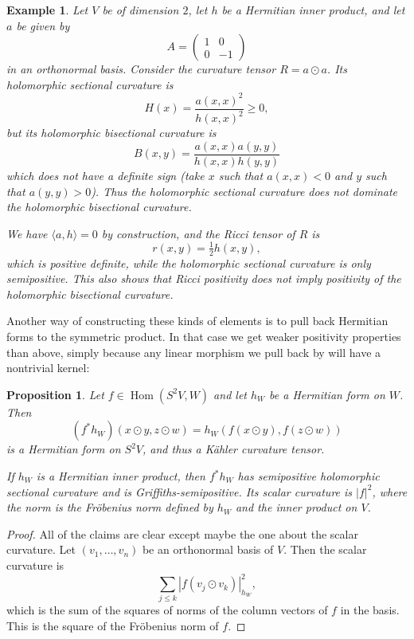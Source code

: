 \documentclass[11pt]{article}
\newtheorem{prop}[theo]{Proposition}
\newtheorem{exam}[theo]{Example}
\newtheorem*{proof}{Proof}
\DeclareMathOperator{\Hom}{Hom}
\begin{document}
\begin{exam}
\label{exam:not-griffiths-positive}
Let $V$ be of dimension $2$, let $h$ be a Hermitian inner product, and let $a$ be given by
$$
A = \begin{pmatrix} 1 & 0 \\ 0 & -1 \end{pmatrix}
$$
in an orthonormal basis. Consider the curvature tensor $R = a \odot a$. Its holomorphic sectional curvature is
$$
H(x) = \frac{a(x,x)^2}{h(x,x)^2} \geq 0,
$$
but its holomorphic bisectional curvature is
$$
B(x,y) = \frac{a(x,x)a(y,y)}{h(x,x)h(y,y)}
$$
which does not have a definite sign (take $x$ such that $a(x,x) < 0$ and $y$ such that $a(y,y) > 0$). Thus the holomorphic sectional curvature does not dominate the holomorphic bisectional curvature.

We have $\langle a, h \rangle = 0$ by construction, and the Ricci tensor of $R$ is
$$
r(x,y) = \tfrac12 h(x, y),
$$
which is positive definite, while the holomorphic sectional curvature is only semipositive. This also shows that Ricci positivity does not imply positivity of the holomorphic bisectional curvature.
\end{exam}


Another way of constructing these kinds of elements is to pull back Hermitian forms to the symmetric product. In that case we get weaker positivity properties than above, simply because any linear morphism we pull back by will have a nontrivial kernel:

\begin{prop}
\label{prop:algebraic-curvature-second-fundamental}
Let $f \in \Hom(S^2V, W)$ and let $h_W$ be a Hermitian form on $W$. Then
$$
(f^*h_W)(x \odot y, z \odot w)
= h_W(f(x \odot y), f(z \odot w))
$$
is a Hermitian form on $S^2V$, and thus a K\"ahler curvature tensor.

If $h_W$ is a Hermitian inner product, then $f^*h_W$ has semipositive holomorphic sectional curvature and is Griffiths-semipositive. Its scalar curvature is $|f|^2$, where the norm is the Fr\"obenius norm defined by $h_W$ and the inner product on $V$.
\end{prop}

\begin{proof}
All of the claims are clear except maybe the one about the scalar curvature. Let $(v_1, \ldots, v_n)$ be an orthonormal basis of $V$. Then the scalar curvature is
\[
\sum_{j \leq k} |f(v_j \odot v_k)|^2_{h_W},
\]
which is the sum of the squares of norms of the column vectors of $f$ in the basis. This is the square of the Fr\"obenius norm of $f$.
\end{proof}
\end{document}
